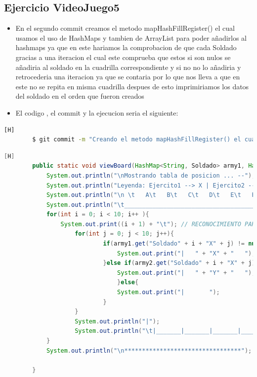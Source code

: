 \documentclass{article}
\begin{document}
	\subsection{Ejercicio VideoJuego5}
	\begin{itemize}	
		\item En el segundo commit creamos el metodo mapHashFillRegister() el cual usamos el uso de HashMaps y tambien de ArrayList para poder añadirlos al hashmaps ya que en este hariamos la comprobacion de que cada Soldado gracias a una iteracion el cual este comprueba que estos si son nulos se añadiria al soldado en la cuadrilla correspondiente y si no no lo añadiria y retrocederia una iteracion ya que se contaria por lo que nos lleva a que en este no se repita en misma cuadrilla despues de esto imprimiriamos los datos del soldado en el orden que fueron creados
		\item El codigo , el commit y la ejecucion seria el siguiente:
	\end{itemize}	
	\begin{lstlisting}[language=bash,caption={Commit}][H]
		$ git commit -m "Creando el metodo mapHashFillRegister() el cual usamos el uso de HashMaps y tambien de ArrayList para poder anadirlos al hashmaps ya que en este hariamos la comprobacion de que cada Soldado en este no se repita en misma cuadrilla despues de esto imprimiriamos los datos del soldado en el orden que fueron creados"
	\end{lstlisting}	
	\begin{lstlisting}[language=java,caption={Las lineas de codigos del metodo creado:}][H]
		public static void viewBoard(HashMap<String, Soldado> army1, HashMap<String, Soldado> army2){ //EN ESTE METODO DEMOSTRAREMOS LA TABLA REUTILIZAREMOS CODIGOS DE ANTERIORES LABORATORIOS PARA PODER HACER LA BASE DE ESTE TABLERO
			System.out.println("\nMostrando tabla de posicion ... --");
			System.out.println("Leyenda: Ejercito1 --> X | Ejercito2 --> Y"); //RECONOCIMIENTO PARA LOS EJERCITOS Y POSICION DE SUS SOLDADOS
			System.out.println("\n \t   A\t   B\t   C\t   D\t   E\t   F\t   G\t   H\t   I\t   J"); // RECONOCIMIENTO PARA CADA UBICACION DE CADA SOLDADO EN EL TABLERO POR PARTE DE LAS COLUMNAS
			System.out.println("\t_________________________________________________________________________________");
			for(int i = 0; i < 10; i++ ){
				System.out.print((i + 1) + "\t"); // RECONOCIMIENTO PARA CADA UBICACION DE CADA SOLDADO EN EL TABLERO POR PARTE DE LAS FILAS
					for(int j = 0; j < 10; j++){
							if(army1.get("Soldado" + i + "X" + j) != null){
								System.out.print("|   " + "X" + "   "); //VERIFICANDOLA POSICIONES DE CADA SOLDADO DE CADA EJERCITO CON SU RESPECTIVO INDICADOR PARA PODER UBICARLOS
							}else if(army2.get("Soldado" + i + "X" + j) != null){
								System.out.print("|   " + "Y" + "   ");
								}else{
								System.out.print("|       ");
							}
					}
					System.out.println("|");
					System.out.println("\t|_______|_______|_______|_______|_______|_______|_______|_______|_______|_______|");
			}
			System.out.println("\n*********************************");

		}
	\end{lstlisting}
\end{document}
